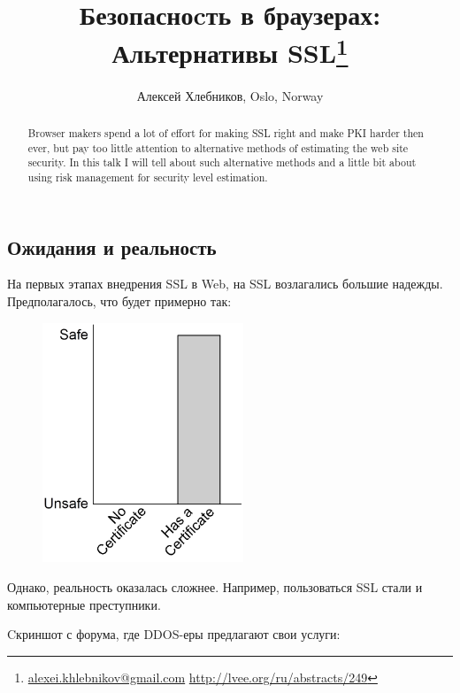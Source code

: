 \documentclass[10pt, a5paper]{article}
\begin{document}
\title{Безопасноcть в браузерах: Альтернативы SSL\footnote{\url{alexei.khlebnikov@gmail.com} \url{http://lvee.org/ru/abstracts/249}}}
\author{Алексей Хлебников, Oslo, Norway}
\maketitle
\begin{abstract}
Browser makers spend a lot of effort for making SSL right and make PKI
harder then ever, but pay too little attention to alternative methods
of estimating the web site security. In this talk I will tell about
such alternative methods and a little bit about using risk management
for security level estimation.
\end{abstract}
\subsection*{Ожидания и реальность}

На первых этапах внедрения SSL в Web, на SSL возлагались большие
надежды. Предполагалось, что будет примерно так:

\begin{center}

\begin{figure}[h!]
  \centering
  \includegraphics[width=6cm]{Hlebnikov1.png}
  
  \label{Hlebnikov1}
\end{figure}

\end{center}

Однако, реальность оказалась сложнее. Например, пользоваться SSL стали
и компьютерные преступники.

Cкриншот с форума, где DDOS-еры предлагают свои услуги: 
\end{document}
